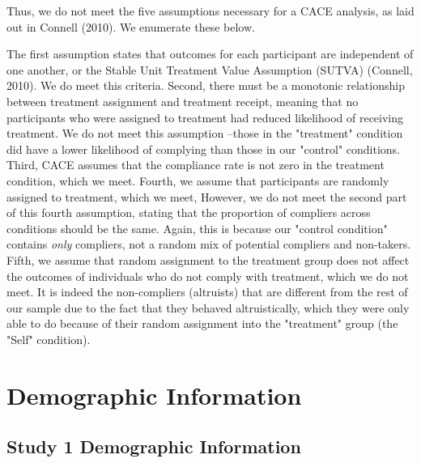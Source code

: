 \documentclass[12pt,]{article}
\begin{document}
Thus, we do not meet the five assumptions necessary for a CACE analysis, as laid out in Connell (2010). We enumerate these below. 

The first assumption states that outcomes for each participant are independent of one another, or the Stable Unit Treatment Value Assumption (SUTVA) (Connell, 2010). We do meet this criteria. Second, there must be a monotonic relationship between treatment assignment and treatment receipt, meaning that no participants who were assigned to treatment had reduced likelihood of receiving treatment. We do not meet this assumption --those in the "treatment" condition did have a lower likelihood of complying than those in our "control" conditions. Third, CACE assumes that the compliance rate is not zero in the treatment condition, which we meet. Fourth, we assume that participants are randomly assigned to treatment, which we meet, However, we do not meet the second part of this fourth assumption, stating that the proportion of compliers across conditions should be the same. Again, this is because our "control condition" contains \emph{only} compliers, not a random mix of potential compliers and non-takers. Fifth, we assume that random assignment to the treatment group does not affect the outcomes of individuals who do not comply with treatment, which we do not meet. It is indeed the non-compliers (altruists) that are different from the rest of our sample due to the fact that they behaved altruistically, which they were only able to do because of their random assignment into the "treatment" group (the "Self" condition). 


\newpage
\section{Demographic Information}
\label{appendix:recruit}

\subsection{Study 1 Demographic Information}
\label{appendix:recruit_1}
\end{document}

